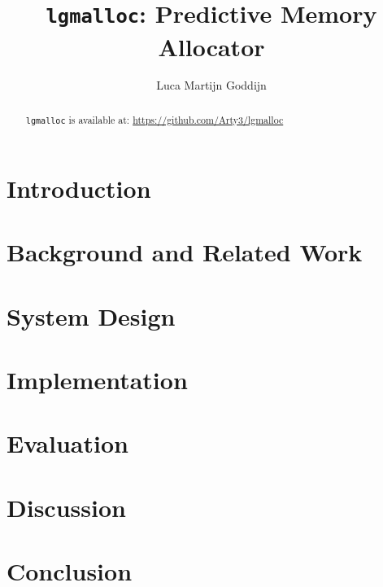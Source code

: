 \documentclass[sigconf,authordraft]{acmart}
\begin{document}

\title{\texttt{lgmalloc}: Predictive Memory Allocator}

\author{Luca Martijn Goddijn}

\begin{abstract}
  \texttt{lgmalloc} is available at: \url{https://github.com/Arty3/lgmalloc}
\end{abstract}


\maketitle

\section{Introduction}

\section{Background and Related Work}  

\section{System Design}

\section{Implementation}

\section{Evaluation}

\section{Discussion}

\section{Conclusion}



\end{document}
